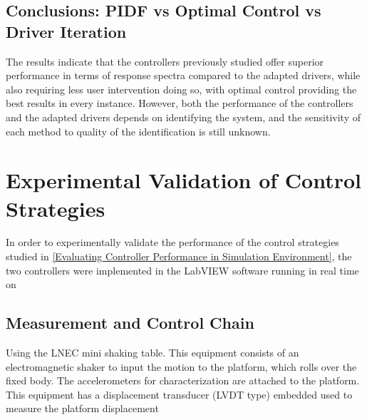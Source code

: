 \documentclass[10pt]{extarticle}
\begin{document}
\subsection{ Conclusions: PIDF vs Optimal Control vs Driver Iteration }


The results indicate that the controllers previously studied offer superior performance in terms of response spectra compared to the adapted drivers, while also requiring less user intervention doing so, with optimal control providing the best results in every instance. However, both the performance of the controllers and the adapted drivers depends on identifying the system, and the sensitivity of each method to quality of the identification is still unknown.


\section{Experimental Validation of Control Strategies}
In order to experimentally validate the performance of the control strategies studied in \ref{Evaluating Controller Performance in Simulation Environment}, the two controllers were implemented in the LabVIEW software running in real time on 


\subsection{ Measurement and Control Chain }%
Using the LNEC mini shaking table. This equipment consists of an electromagnetic shaker to input the motion to the platform, which rolls over the fixed body.
The accelerometers for characterization are attached to the platform. This equipment has a
displacement transducer (LVDT type) embedded used to measure the platform displacement
\end{document}
